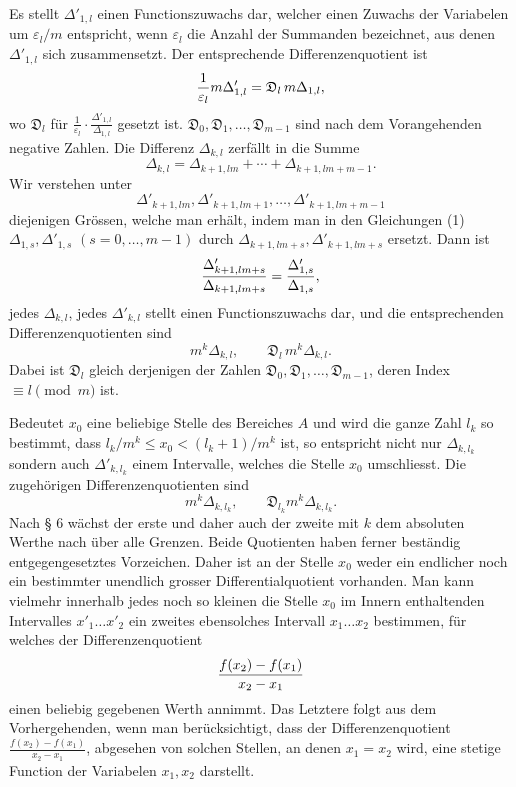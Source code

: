 \documentclass[11pt,a4paper]{article}
\begin{document}
Es stellt $\Delta'_{1,l}$ einen Functionszuwachs dar, welcher einen Zuwachs der Variabelen um $\varepsilon_l/m$ entspricht, wenn $\varepsilon_l$ die Anzahl der Summanden bezeichnet, aus denen $\Delta'_{1,l}$ sich zusammensetzt. Der entsprechende Differenzenquotient ist
\[
 {1\over\varepsilon_l}m\Delta'_{1,l}=\mathfrak D_l\,m\Delta_{1,l},
\]
wo $\mathfrak D_l$ für $\frac1{\varepsilon_l}\cdot\frac{\Delta'_{1,l}}{\Delta_{1,l}}$ gesetzt ist. $\mathfrak D_0,\mathfrak D_1,\ldots,\mathfrak D_{m-1}$ sind nach dem Vorangehenden negative Zahlen. Die Differenz $\Delta_{k,l}$ zerfällt in die Summe
\[
 \Delta_{k,l}=\Delta_{k+1,lm}+\cdots+\Delta_{k+1,lm+m-1}.
\]
Wir verstehen unter
\[
 \Delta'_{k+1,lm},\Delta'_{k+1,lm+1},\ldots,\Delta'_{k+1,lm+m-1}
\]
diejenigen Grössen, welche man erhält, indem man in den Gleichungen (1) $\Delta_{1,s},\Delta'_{1,s}$ $(s=0,
\ldots,m-1)$ durch $\Delta_{k+1,lm+s},\Delta'_{k+1,lm+s}$ ersetzt. Dann ist
\[
 {\Delta'_{k+1,lm+s}\over\Delta_{k+1,lm+s}}={\Delta'_{1,s}\over\Delta_{1,s}},
\]
jedes $\Delta_{k,l}$, jedes $\Delta'_{k,l}$ stellt einen Functionszuwachs dar, und die entsprechenden Differenzenquotienten sind
\[
 m^k\Delta_{k,l},
 \qquad
 \mathfrak D_l\,m^k\Delta_{k,l}.
\]
Dabei ist $\mathfrak D_l$ gleich derjenigen der Zahlen $\mathfrak D_0,\mathfrak D_1,\ldots,\mathfrak D_{m-1}$, deren Index $\equiv l\pmod m$ ist.

Bedeutet $x_0$ eine beliebige Stelle des Bereiches $A$ und wird die ganze Zahl $l_k$ so bestimmt, dass $l_k/m^k\le x_0<(l_k+1)/m^k$ ist, so entspricht nicht nur $\Delta_{k,l_k}$ sondern auch $\Delta'_{k,l_k}$ einem Intervalle, welches die Stelle $x_0$ umschliesst. Die zugehörigen Differenzenquotienten sind
\[
 m^k\Delta_{k,l_k},
 \qquad
 \mathfrak D_{l_k}m^k\Delta_{k,l_k}.
\]
Nach § 6 wächst der erste und daher auch der zweite mit $k$ dem absoluten Werthe nach über alle Grenzen. Beide Quotienten haben ferner beständig entgegengesetztes Vorzeichen. Daher ist an der Stelle $x_0$ weder ein endlicher noch ein bestimmter unendlich grosser Differentialquotient vorhanden. Man kann vielmehr innerhalb jedes noch so kleinen die Stelle $x_0$ im Innern enthaltenden Intervalles $x'_1\ldots x'_2$ ein zweites ebensolches Intervall $x_1\ldots x_2$ bestimmen, für welches der Differenzenquotient
\[
 {f(x_2)-f(x_1)\over x_2-x_1}
\]
einen beliebig gegebenen Werth annimmt. Das Letztere folgt aus dem Vorhergehenden, wenn man berücksichtigt, dass der Differenzenquotient $\frac{f(x_2)-f(x_1)}{x_2-x_1}$, abgesehen von solchen Stellen, an denen $x_1=x_2$ wird, eine stetige Function der Variabelen $x_1,x_2$ darstellt.
\end{document}

